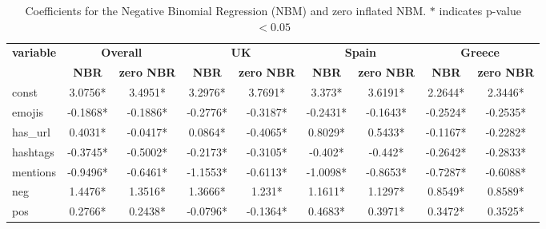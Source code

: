 \begin{table}[ht]
\begin{adjustbox}{width=\textwidth,center}
\begin{tabular}{|l|cc|cc|cc|cc|}
\hline
\multirow{2}{*}{\textbf{variable}} &
  \multicolumn{2}{c|}{\textbf{Overall}} &
  \multicolumn{2}{c|}{\textbf{UK}} &
  \multicolumn{2}{c|}{\textbf{Spain}} &
  \multicolumn{2}{c|}{\textbf{Greece}} \\ \cline{2-9} 
 &
  \multicolumn{1}{c|}{\textbf{NBR}} &
  \textbf{zero NBR} &
  \multicolumn{1}{c|}{\textbf{NBR}} &
  \textbf{zero NBR} &
  \multicolumn{1}{c|}{\textbf{NBR}} &
  \textbf{zero NBR} &
  \multicolumn{1}{c|}{\textbf{NBR}} &
  \textbf{zero NBR} \\ \hline
const &
  \multicolumn{1}{c|}{3.0756*} &
  3.4951* &
  \multicolumn{1}{c|}{3.2976*} &
  3.7691* &
  \multicolumn{1}{c|}{3.373*} &
  3.6191* &
  \multicolumn{1}{c|}{2.2644*} &
  2.3446* \\ \hline
emojis &
  \multicolumn{1}{c|}{-0.1868*} &
  -0.1886* &
  \multicolumn{1}{c|}{-0.2776*} &
  -0.3187* &
  \multicolumn{1}{c|}{-0.2431*} &
  -0.1643* &
  \multicolumn{1}{c|}{-0.2524*} &
  -0.2535* \\ \hline
has\_url &
  \multicolumn{1}{c|}{0.4031*} &
  -0.0417* &
  \multicolumn{1}{c|}{0.0864*} &
  -0.4065* &
  \multicolumn{1}{c|}{0.8029*} &
  0.5433* &
  \multicolumn{1}{c|}{-0.1167*} &
  -0.2282* \\ \hline
hashtags &
  \multicolumn{1}{c|}{-0.3745*} &
  -0.5002* &
  \multicolumn{1}{c|}{-0.2173*} &
  -0.3105* &
  \multicolumn{1}{c|}{-0.402*} &
  -0.442* &
  \multicolumn{1}{c|}{-0.2642*} &
  -0.2833* \\ \hline
mentions &
  \multicolumn{1}{c|}{-0.9496*} &
  -0.6461* &
  \multicolumn{1}{c|}{-1.1553*} &
  -0.6113* &
  \multicolumn{1}{c|}{-1.0098*} &
  -0.8653* &
  \multicolumn{1}{c|}{-0.7287*} &
  -0.6088* \\ \hline
neg &
  \multicolumn{1}{c|}{1.4476*} &
  1.3516* &
  \multicolumn{1}{c|}{1.3666*} &
  1.231* &
  \multicolumn{1}{c|}{1.1611*} &
  1.1297* &
  \multicolumn{1}{c|}{0.8549*} &
  0.8589* \\ \hline
pos &
  \multicolumn{1}{c|}{0.2766*} &
  0.2438* &
  \multicolumn{1}{c|}{-0.0796*} &
  -0.1364* &
  \multicolumn{1}{c|}{0.4683*} &
  0.3971* &
  \multicolumn{1}{c|}{0.3472*} &
  0.3525* \\ \hline
\end{tabular}
\end{adjustbox}
\caption{Coefficients for the Negative Binomial Regression (NBM) and zero inflated NBM. $*$ indicates p-value $< 0.05$ }
\label{tab:binomial_reg}
\end{table}



